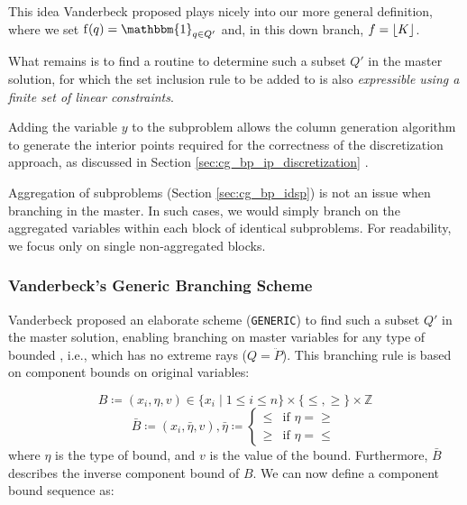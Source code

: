 This idea Vanderbeck proposed plays nicely into our more general definition, where we set $\operatorname{f}(q) = \mathbbm{1}_{q \in Q'}$ and, in this down branch, $f = \lfloor K\rfloor$.

What remains is to find a routine to determine such a subset $Q'$ in the master solution, for which the set inclusion rule to be added to \SP{} is also \textit{expressible using a finite set of linear constraints}.

\begin{note}
Adding the variable $y$ to the subproblem allows the column generation algorithm to generate the interior points required for the correctness of the discretization approach, as discussed in Section \ref{sec:cg_bp_ip_discretization} \cite{vanderbeck1996exact}.
\end{note}

\begin{note}
Aggregation of subproblems (Section \ref{sec:cg_bp_idsp}) is not an issue when branching in the master. In such cases, we would simply branch on the aggregated variables within each block of identical subproblems. For readability, we focus only on single non-aggregated blocks.
\end{note}

\subsubsection{Vanderbeck's Generic Branching Scheme}\label{sec:cg_bp_bp_branching_generic}
Vanderbeck proposed an elaborate scheme (\texttt{GENERIC}) \cite{vanderbeck2010reformulation,vanderbeck1996exact} to find such a subset $Q'$ in the master solution, enabling branching on master variables for any type of bounded \IP{}, i.e., which has no extreme rays ($Q = \ddot{P}$). This branching rule is based on component bounds on original variables:

\begin{equation}
B \coloneqq \left( x_i, \eta, v \right) \in \{x_i \mid 1 \leq i \leq n\} \times \{\leq, \geq\} \times \mathbb{Z}
\end{equation}
\begin{equation}
\bar{B} \coloneqq \left( x_i, \bar{\eta}, v \right), \bar{\eta} \coloneqq \begin{cases} \leq & \text{if } \eta = \geq \\ \geq & \text{if } \eta = \leq \end{cases}
\end{equation}
where $\eta$ is the type of bound, and $v$ is the value of the bound. Furthermore, $\bar{B}$ describes the inverse component bound of $B$. We can now define a component bound sequence as:

